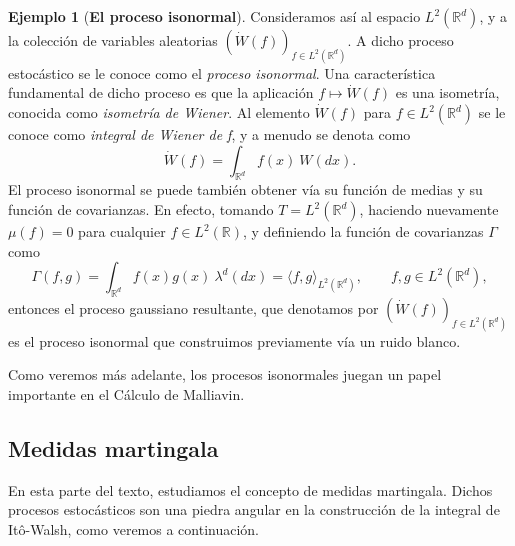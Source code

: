 \documentclass[letterpaper,twoside,12pt]{book}
\newcommand{\R}{\mathbb{R}}
\newcommand{\W}{\dot{W}}
\newcommand{\1}{\mathds{1}}
\theoremstyle{definition}
\theoremstyle{definition}
\theoremstyle{remark}
\theoremstyle{definition}
\theoremstyle{definition}
\theoremstyle{definition}
\theoremstyle{definition}
\newtheorem{ejem}{Ejemplo}
\theoremstyle{definition}
\begin{document}
\begin{ejem}[\textbf{El proceso isonormal}]
Consideramos así al espacio $L^{2}(\R^{d})$, y a la colección de variables aleatorias $(\W(f))_{f\in L^{2}(\R^{d})}$. A dicho proceso estocástico se le conoce como el \textit{proceso isonormal}. Una característica fundamental de dicho proceso es que la aplicación $f\mapsto\W(f)$ es una isometría, conocida como \textit{isometría de Wiener}. Al elemento $\W(f)$ para $f\in L^2(\R^{d})$ se le conoce como \textit{integral de Wiener de f}, y a menudo se denota como
\[
\W(f)=\int_{\R^d} f(x) \ W(dx).    
\] 
El proceso isonormal se puede también obtener vía su función de medias y su función de covarianzas. En efecto, tomando $T=L^{2}(\R^{d})$, haciendo nuevamente $\mu(f)=0$ para cualquier $f\in L^2(\R)$, y definiendo la función de covarianzas $\Gamma$ como
\[
\Gamma(f,g)=\int_{\R^d}f(x)g(x) \ \lambda^d(dx)=\langle f,g\rangle_{L^{2}(\R^{d})}, \qquad f,g\in L^2(\R^{d}),
\]
entonces el proceso gaussiano resultante, que denotamos por $(\W(f))_{f\in L^{2}(\R^{d})}$ es el proceso isonormal que construimos previamente vía un ruido blanco. 
 \end{ejem}

 Como veremos más adelante, los procesos isonormales juegan un papel importante en el Cálculo de Malliavin.
\subsection{Medidas martingala}

En esta parte del texto, estudiamos el concepto de medidas martingala. Dichos procesos estocásticos son una piedra angular en la construcción de la integral de Itô-Walsh, como veremos a continuación.
\end{document}

